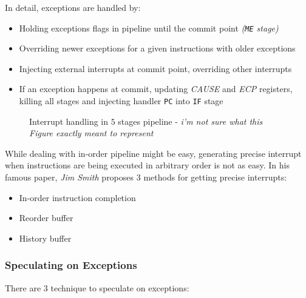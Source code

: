 \documentclass[english]{article}
\begin{document}
\bigskip
In detail, exceptions are handled by:

\begin{itemize}
  \item Holding exceptions flags in pipeline until the commit point \textit{(\texttt{ME} stage)}
  \item Overriding newer exceptions for a given instructions with older exceptions
  \item Injecting external interrupts at commit point, overriding other interrupts
  \item If an exception happens at commit, updating \textit{CAUSE} and \textit{ECP} registers, killing all stages and injecting handler \texttt{PC} into \texttt{IF} stage
\end{itemize}

\begin{figure}[htbp]
  \bigskip
  \centering
  \caption{Interrupt handling in \(5\) stages pipeline - \textit{i'm not sure what this Figure exactly meant to represent}}
  \label{fig:interrupt-handling-5-stages-pipeline}
  \bigskip
\end{figure}

While dealing with in-order pipeline might be easy, generating precise interrupt when instructions are being executed in arbitrary order is not as easy.
In his famous paper, \textit{Jim Smith} proposes \(3\) methods for getting precise interrupts:

\begin{itemize}
  \item In-order instruction completion
  \item Reorder buffer
  \item History buffer
\end{itemize}

\subsubsection{Speculating on Exceptions}

There are \(3\) technique to speculate on exceptions:
\end{document}
